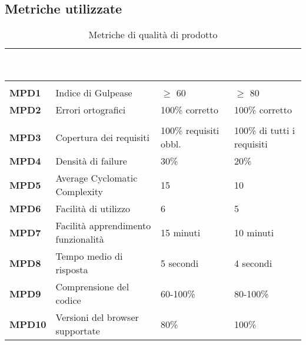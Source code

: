 \newpage

\subsection{Metriche utilizzate}
{
\renewcommand{\arraystretch}{1.5}
\setlength\arrayrulewidth{0.9pt}
\begin{longtable}{C{2.5cm} | C{5cm} | C{4cm} | C{4cm}}
\textcolor{white}{\textbf{Codice}}&
\textcolor{white}{\textbf{Nome metrica}}&
\textcolor{white}{\textbf{Valore accettabile}}&
\textcolor{white}{\textbf{Valore ottimale}}\\	
\endhead
\endfoot
{}\caption{Metriche di qualità di prodotto}
\endlastfoot

 \\

	\textbf{MPD1} & Indice di Gulpease & $\geq$ 60 & $\geq$ 80\\
	\textbf{MPD2} & Errori ortografici & 100\% corretto & 100\% corretto \\
	
 \\

	\textbf{MPD3} & Copertura dei requisiti & 100\% requisiti obbl. & 100\% di tutti i requisiti \\
		
	\textbf{MPD4} & Densità di failure & 30\% & 20\% \\

	\textbf{MPD5} & Average Cyclomatic Complexity & 15 & 10 \\		
	\textbf{MPD6} & Facilità di utilizzo & 6 & 5 \\
	\textbf{MPD7} & Facilità apprendimento funzionalità & 15 minuti & 10 minuti\\

 	\textbf{MPD8} & Tempo medio di risposta & 5 secondi & 4 secondi \\
	
 	\textbf{MPD9} & Comprensione del codice & 60-100\% & 80-100\% \\

	\textbf{MPD10} & Versioni del browser supportate & 80\% & 100\% \\
\end{longtable}


	
}
